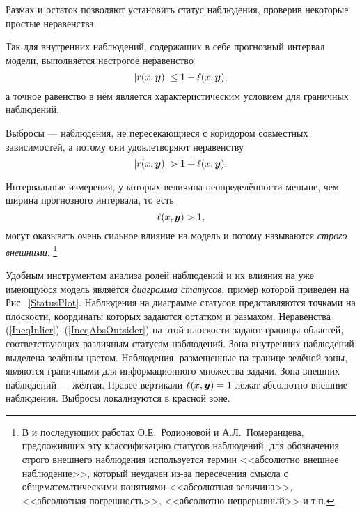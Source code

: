 \documentclass[a5paper,openany]{book}
\newcommand{\mbf}[1]{\protect\text{\boldmath$#1$}}
\begin{document}
Размах и остаток позволяют установить статус наблюдения, проверив некоторые 
простые неравенства. 

Так для внутренних наблюдений, содержащих в себе прогнозный интервал модели, 
выполняется нестрогое неравенство 
\begin{equation} 
\label{IneqInlier} 
|r(x,\mbf{y})| \leq 1 - \ell(x,\mbf{y}),
\end{equation}
а точное равенство в нём является характеристическим условием для граничных наблюдений.

Выбросы --- наблюдения, не пересекающиеся с коридором совместных зависимостей, а потому 
они удовлетворяют неравенству 
\begin{equation} 
\label{IneqOutlier}
    |r(x,\mbf{y})| > 1 + \ell(x,\mbf{y}).
\end{equation}

Интервальные измерения, у которых величина неопределённости меньше, чем ширина 
прогнозного интервала, то есть 
\begin{equation} 
\label{IneqAbsOutsider} 
\ell(x,\mbf{y}) > 1,
\end{equation}
могут оказывать очень сильное влияние на модель и потому называются 
 \textit{строго внешними}.%
\footnote{В \cite{PomeRodionova} и последующих работах О.Е.~Родионовой 
и А.Л.~Померанцева, предложивших эту классификацию статусов наблюдений, 
для обозначения строго внешнего наблюдения используется термин 
<<абсолютно внешнее наблюдение>>, который неудачен из-за пересечения 
смысла с общематематическими понятиями <<абсолютная величина>>, 
<<абсолютная погрешность>>, <<абсолютно непрерывный>> и т.п.} 
  
Удобным инструментом анализа ролей наблюдений и их влияния на уже имеющуюся модель 
является \textit{диаграмма статусов}, пример которой приведен на Рис.~\ref{StatusPlot}. 
Наблюдения на диаграмме статусов представляются точками на плоскости, координаты 
которых  задаются остатком и размахом. Неравенства 
(\ref{IneqInlier})--(\ref{IneqAbsOutsider}) на этой плоскости задают границы областей, 
соответствующих различным статусам наблюдений. Зона внутренних наблюдений выделена 
зелёным цветом. Наблюдения, размещенные на границе зелёной зоны, являются граничными 
для информационного множества задачи. Зона внешних наблюдений ---  жёлтая. Правее 
вертикали $\ell(x,\mbf{y}) = 1$ лежат абсолютно внешние наблюдения. Выбросы 
локализуются в красной зоне. 
 
\end{document}
